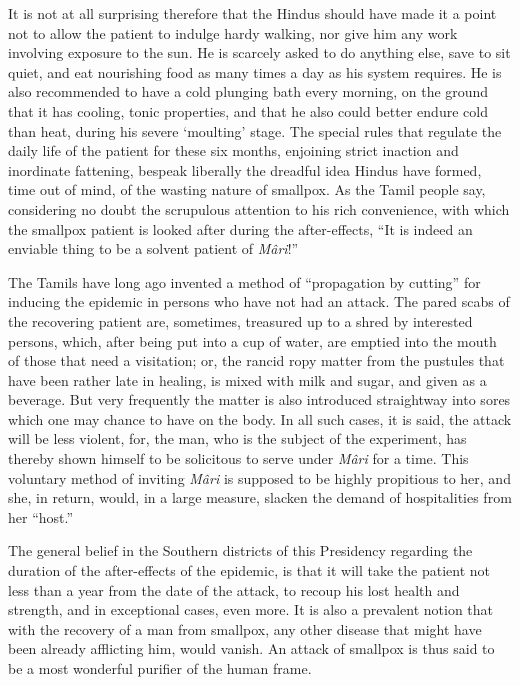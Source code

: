 \documentclass[a4paper, 12pt, oneside, english]{article}
\begin{document}
It is not at all surprising therefore that the Hindus should have made it a point not to allow the patient to indulge hardy walking, nor give him any work involving exposure to the sun. He is scarcely asked to do anything else, save to sit quiet, and eat nourishing food as many times a day as his system requires. He is also recommended to have a cold plunging bath every morning, on the ground that it has cooling, tonic properties, and that he also could better endure cold than heat, during his severe `moulting' stage. The special rules that regulate the daily life of the patient for these six months, enjoining strict inaction and inordinate fattening, bespeak liberally the dreadful idea Hindus have formed, time out of mind, of the wasting nature of smallpox. As the Tamil people say, considering no doubt the scrupulous attention to his rich convenience, with which the smallpox patient is looked after during the after-effects, ``It is indeed an enviable thing to be a solvent patient of \emph{Mâri}!''

The Tamils have long ago invented a method of ``propagation by cutting'' for inducing the epidemic in persons who have not had an attack. The pared scabs of the recovering patient are, sometimes, treasured up to a shred by interested persons, which, after being put into a cup of water, are emptied into the mouth of those that need a visitation; or, the rancid ropy matter from the pustules that have been rather late in healing, is mixed with milk and sugar, and given as a beverage. But very frequently the matter is also introduced straightway into sores which one may chance to have on the body. In all such cases, it is said, the attack will be less violent, for, the man, who is the subject of the experiment, has thereby shown himself to be solicitous to serve under \emph{Mâri} for a time. This voluntary method of inviting \emph{Mâri} is supposed to be highly propitious to her, and she, in return, would, in a large measure, slacken the demand of hospitalities from her ``host.''

The general belief in the Southern districts of this Presidency regarding the duration of the after-effects of the epidemic, is that it will take the patient not less than a year from the date of the attack, to recoup his lost health and strength, and in exceptional cases, even more. It is also a prevalent notion that with the recovery of a man from smallpox, any other disease that might have been already afflicting him, would vanish. An attack of smallpox is thus said to be a most wonderful purifier of the human frame.
\end{document}
